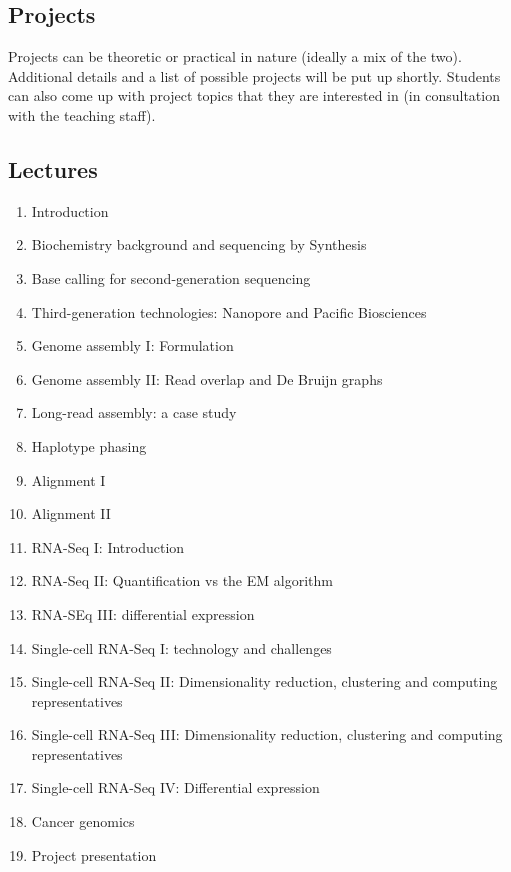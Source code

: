 \documentclass[11pt,onecolumn]{article}
\begin{document}
\subsection*{Projects}
Projects can be theoretic or practical in nature (ideally a mix of the two). Additional details and a list of possible projects will be put up shortly. Students can also come up with project topics that they are interested in (in consultation with the teaching staff). \\

\pagebreak

\subsection*{Lectures}
\begin{enumerate}
	\item Introduction
	\item Biochemistry background and sequencing by Synthesis
	\item Base calling for second-generation sequencing
	\item Third-generation technologies: Nanopore and Pacific Biosciences
	\item Genome assembly I: Formulation
	\item Genome assembly II: Read overlap and De Bruijn graphs
	\item Long-read assembly: a case study
	\item Haplotype phasing
	\item Alignment I
	\item Alignment II
	\item RNA-Seq I: Introduction
	\item RNA-Seq II: Quantification vs the EM algorithm
	\item RNA-SEq III: differential expression
	\item Single-cell RNA-Seq I: technology and challenges
	\item Single-cell RNA-Seq II: Dimensionality reduction, clustering and computing representatives
	\item Single-cell RNA-Seq III: Dimensionality reduction, clustering and computing representatives
	\item Single-cell RNA-Seq IV: Differential expression
	\item Cancer genomics
	\item Project presentation
\end{enumerate}
\end{document}
